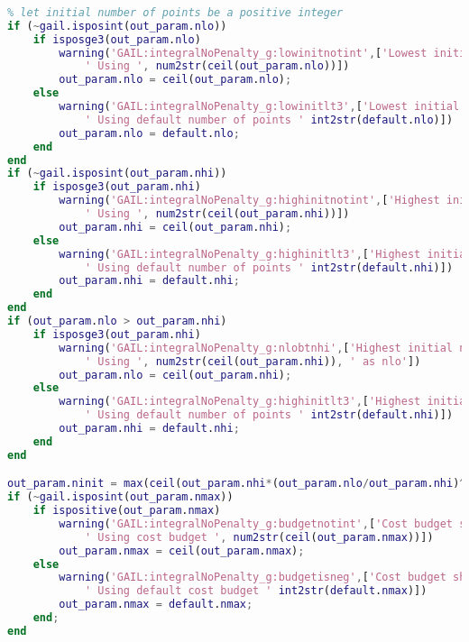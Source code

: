 \documentclass{iitthesis}
\begin{document}
\begin{lstlisting}[language=Matlab]
    
% let initial number of points be a positive integer
if (~gail.isposint(out_param.nlo))
    if isposge3(out_param.nlo)
        warning('GAIL:integralNoPenalty_g:lowinitnotint',['Lowest initial number of points should be a positive integer.' ...
            ' Using ', num2str(ceil(out_param.nlo))])
        out_param.nlo = ceil(out_param.nlo);
    else
        warning('GAIL:integralNoPenalty_g:lowinitlt3',['Lowest initial number of points should be a positive integer.' ...
            ' Using default number of points ' int2str(default.nlo)])
        out_param.nlo = default.nlo;
    end
end
if (~gail.isposint(out_param.nhi))
    if isposge3(out_param.nhi)
        warning('GAIL:integralNoPenalty_g:highinitnotint',['Highest initial number of points should be a positive integer.' ...
            ' Using ', num2str(ceil(out_param.nhi))])
        out_param.nhi = ceil(out_param.nhi);
    else
        warning('GAIL:integralNoPenalty_g:highinitlt3',['Highest initial number of points should be a positive integer.' ...
            ' Using default number of points ' int2str(default.nhi)])
        out_param.nhi = default.nhi;
    end
end
if (out_param.nlo > out_param.nhi)
    if isposge3(out_param.nhi)
        warning('GAIL:integralNoPenalty_g:nlobtnhi',['Highest initial number of points should be at least equal to to lowest initial number of points.' ...
            ' Using ', num2str(ceil(out_param.nhi)), ' as nlo'])
        out_param.nlo = ceil(out_param.nhi);
    else
        warning('GAIL:integralNoPenalty_g:highinitlt3',['Highest initial number of points should be a positive integer.' ...
            ' Using default number of points ' int2str(default.nhi)])
        out_param.nhi = default.nhi;
    end
end

out_param.ninit = max(ceil(out_param.nhi*(out_param.nlo/out_param.nhi)^(1/(1+(out_param.b-out_param.a)))),3);
if (~gail.isposint(out_param.nmax))
    if ispositive(out_param.nmax)
        warning('GAIL:integralNoPenalty_g:budgetnotint',['Cost budget should be a positive integer.' ...
            ' Using cost budget ', num2str(ceil(out_param.nmax))])
        out_param.nmax = ceil(out_param.nmax);
    else
        warning('GAIL:integralNoPenalty_g:budgetisneg',['Cost budget should be a positive integer.' ...
            ' Using default cost budget ' int2str(default.nmax)])
        out_param.nmax = default.nmax;
    end;
end
\end{lstlisting}
\end{document}
